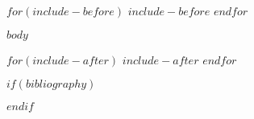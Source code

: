 \documentclass[draftthesis,tocnosub,noragright,centerchapter,12pt]{uiucecethesis09}
\begin{document}


%

\mainmatter

%

$for(include-before)$
$include-before$
$endfor$

$body$

$for(include-after)$
$include-after$
$endfor$

%
\appendix
%

\backmatter

%


$if(bibliography)$

$endif$


\end{document}
